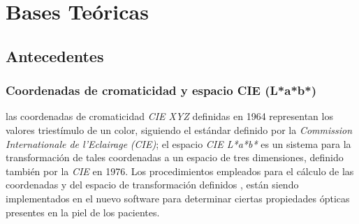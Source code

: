 \documentclass[conference]{IEEEtran}
\renewcommand{\arraystretch}{1.3}
\begin{document}
%



\section{Bases Te\'{o}ricas}

	\subsection{Antecedentes}
		\subsubsection{Coordenadas de cromaticidad y espacio CIE (L*a*b*)}
			las coordenadas de cromaticidad \textit{CIE XYZ} definidas en 1964 representan los valores triest\'{i}mulo de un color, siguiendo el est\'{a}ndar definido por la \textit{\mbox{Commission} Internationale de l'Eclairage} \textit{(CIE)}\cite{CIE}; el espacio \textit{CIE L*a*b*} es un sistema para la \mbox{transformaci\'{o}n} de tales coordenadas a un espacio de tres dimensiones, definido tambi\'{e}n por la \textit{CIE} en 1976. Los procedimientos empleados para el c\'{a}lculo de las coordenadas y del espacio de transformaci\'{o}n definidos \cite{Schanda}, est\'{a}n siendo implementados en el nuevo software para determinar ciertas propiedades \'{o}pticas presentes en la piel de los pacientes.
	
\end{document}
